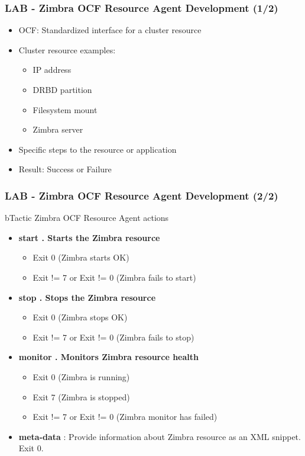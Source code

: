 \documentclass[10pt]{beamer}
\begin{document}
\begin{frame}
\frametitle{LAB - Zimbra OCF Resource Agent Development (1/2)}

\begin{itemize}

\item  {OCF: Standardized interface for a cluster resource}
\item  {Cluster resource examples:
  \begin{itemize}
    \item IP address
    \item DRBD partition
    \item Filesystem mount
    \item Zimbra server
  \end{itemize}
}

\item Specific steps to the resource or application
\item  {Result: Success or Failure}


\end{itemize}
\end{frame}

\begin{frame}
\frametitle{LAB - Zimbra OCF Resource Agent Development (2/2)}

\begin{block}{}
bTactic Zimbra OCF Resource Agent actions
\end{block}

\begin{itemize}

  \item {\textbf{start . Starts the Zimbra resource}
    \begin{itemize}
      \item Exit 0 (Zimbra starts OK)
      \item Exit != 7 or Exit != 0 (Zimbra fails to start)
    \end{itemize}
  }
  \item {\textbf{stop . Stops the Zimbra resource}
    \begin{itemize}
      \item Exit 0 (Zimbra stops OK)
      \item Exit != 7 or Exit != 0 (Zimbra fails to stop)
    \end{itemize}
  }
  \item {\textbf{monitor . Monitors Zimbra resource health}
    \begin{itemize}
      \item Exit 0 (Zimbra is running)
      \item Exit 7 (Zimbra is stopped)
      \item Exit != 7 or Exit != 0 (Zimbra monitor has failed)
    \end{itemize}
  }
  \item {\textbf{meta-data} : Provide information about Zimbra resource as an XML snippet. Exit 0.}

\end{itemize}
\end{frame}
\end{document}
